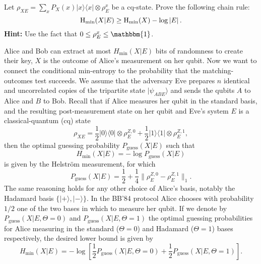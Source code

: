 \documentclass[a4paper,10pt,landscape,twocolumn]{scrartcl}
\newcommand{\ket}[1]{| #1 \rangle}
\newcommand{\bra}[1]{\langle #1 |}
\begin{document}
\begin{exercise}
Let $\rho_{XE} = \sum_x P_X(x) \ket{x}\bra{x} \otimes \rho_E^x$ be a cq-state. Prove the following chain rule:
\[
\mathrm{H}_{\mathrm{min}}(X | E) \geq \mathrm{H}_{\mathrm{min}}(X) - \log |E| \, .
\]
\textbf{Hint: } Use the fact that $0 \leq \rho_E^x \leq \mathbbm{1}$.

\end{exercise}

\begin{exercise}
Alice and Bob can extract at most $H_{\text{min}}(X|E)$ bits of randomness to create their key, $X$ is the outcome of Alice's measurement on her qubit. Now we want to connect the conditional min-entropy to the probability that the matching-outcomes test succeeds. We assume that the adversary Eve prepares $n$ identical and uncorrelated copies of the tripartite state $|\psi _{ABE}\rangle$ and sends the qubits $A$ to Alice and $B$ to Bob.
Recall that if Alice measures her qubit in the standard basis, and the resulting post-measurement state on her qubit and Eve's system $E$ is a classical-quantum (cq) state
\begin{equation}
\rho _{XE} = \frac{1}{2}|0\rangle \langle 0| \otimes \rho _ E^{Z,0}+\frac{1}{2}|1\rangle \langle 1| \otimes \rho _ E^{Z,1},
\end{equation}
then the optimal guessing probability $P_{\text{guess}}(X|E)$ such that
\begin{equation}
H_{\min}(X|E) = - \log P_{\text{guess}}(X|E)
\end{equation}
is given by the Helstr\"om measurement, for which
\begin{equation}
P_{\text{guess}}(X|E) = \frac{1}{2}+\frac{1}{4}\| \rho _ E^{Z,0}-\rho _ E^{Z,1}\| _1.\label{eq:helbnd}
\end{equation}
The same reasoning holds for any other choice of Alice's basis, notably the Hadamard basis $\{ |+\rangle ,|-\rangle \}$. In the BB'84 protocol Alice chooses with probability $1/2$ one of the two bases in which to measure her qubit. If we denote by $P_{\text{guess}}(X|E,\Theta =0)$ and $P_{\text{guess}}(X|E,\Theta =1)$ the optimal guessing probabilities for Alice measuring in the standard ($\Theta =0$) and Hadamard ($\Theta =1$) bases respectively, the desired lower bound is given by
\begin{equation}
H_{\min}(X|E ) = -\log \left[\frac{1}{2}P_{\text{guess}}(X|E,\Theta =0)+\frac{1}{2}P_{\text{guess}}(X|E,\Theta =1)\right]. \label{eq:hminpgues}
\end{equation}




\end{exercise}
\end{document}
